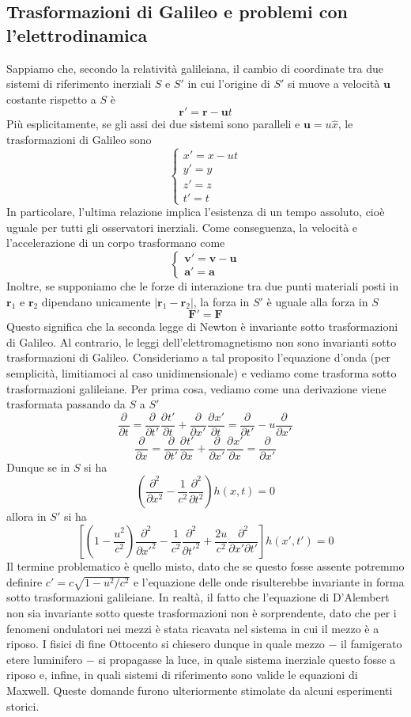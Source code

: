 \documentclass[a4paper,11pt]{book}
\newcommand{\der}[3][]{\frac{\partial ^{#1}#2}{\partial {#3}^{#1}}}
\renewcommand{\vec}[1]{\mathbf{#1}}
\theoremstyle{theorem}
\theoremstyle{definition}
\begin{document}
\subsection{Trasformazioni di Galileo e problemi con l'elettrodinamica}
Sappiamo che, secondo la relatività galileiana, il cambio di coordinate tra due sistemi di riferimento inerziali $S$ e $S'$ in cui l'origine di $S'$ si muove a velocità $\vec{u}$ costante rispetto a $S$ è
\[\vec{r}'=\vec{r}-\vec{u}t\]
Più esplicitamente, se gli assi dei due sistemi sono paralleli e $\vec{u}=u\hat{x}$, le trasformazioni di Galileo sono
\[\begin{cases}
x'=x-ut\\y'=y\\z'=z\\t'=t\end{cases}\]
In particolare, l'ultima relazione implica l'esistenza di un tempo assoluto, cioè uguale per tutti gli osservatori inerziali. Come conseguenza, la velocità e l'accelerazione di un corpo trasformano come
\[\begin{cases}
\vec{v}'=\vec{v}-\vec{u}\\\vec{a}'=\vec{a}
\end{cases}\]
Inoltre, se supponiamo che le forze di interazione tra due punti materiali posti in $\vec{r}_1$ e $\vec{r}_2$ dipendano unicamente $|\vec{r}_1-\vec{r}_2|$, la forza in $S'$ è uguale alla forza in $S$
\[\vec{F}'=\vec{F}\]
Questo significa che la seconda legge di Newton è invariante sotto trasformazioni di Galileo.
Al contrario, le leggi dell'elettromagnetismo non sono invarianti sotto trasformazioni di Galileo.
Consideriamo a tal proposito l'equazione d'onda (per semplicità, limitiamoci al caso unidimensionale) e vediamo come trasforma sotto trasformazioni galileiane. Per prima cosa, vediamo come una derivazione viene trasformata passando da $S$ a $S'$
\[\der{}{t}=\der{}{t'}\der{t'}{t}+\der{}{x'}\der{x'}{t}=\der{}{t'}-u\der{}{x'}\]
\[\der{}{x}=\der{}{t'}\der{t'}{x}+\der{}{x'}\der{x'}{x}=\der{}{x'}\] Dunque se in $S$ si ha
\[\left(\der[2]{}{x}-\frac{1}{c^2}\der[2]{}{t}\right)h(x,t)=0\]
allora in $S'$ si ha
\[\left[\left(1-\frac{u^2}{c^2}\right)\der[2]{}{x'}-\frac{1}{c^2}\der[2]{}{t'}+\frac{2u}{c^2}\frac{\partial^2}{\partial x'\partial t'}\right]h(x',t')=0\]
Il termine problematico è quello misto, dato che se questo fosse assente potremmo definire $c'=c\sqrt{1-u^2/c^2}$ e l'equazione delle onde risulterebbe invariante in forma sotto trasformazioni galileiane. In realtà, il fatto che l'equazione di D'Alembert non sia invariante sotto queste trasformazioni non è sorprendente, dato che per i fenomeni ondulatori nei mezzi è stata ricavata nel sistema in cui il mezzo è a riposo. I fisici di fine Ottocento si chiesero dunque in quale mezzo $-$ il famigerato etere luminifero $-$ si propagasse la luce, in quale sistema inerziale questo fosse a riposo e, infine, in quali sistemi di riferimento sono valide le equazioni di Maxwell. Queste domande furono ulteriormente stimolate da alcuni esperimenti storici.
\end{document}
